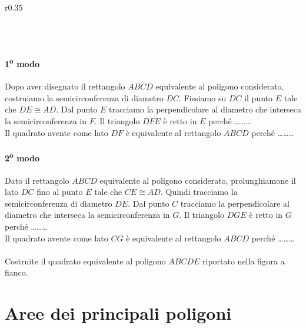 \begin{wrapfigure}{r}{0.35\textwidth}
	
\centering\vspace{6pt}\\
	
\centering\vspace{6pt}
\\
	\centering
\end{wrapfigure}
\paragraph{1\textsuperscript{o} modo}
Dopo aver disegnato il rettangolo \(ABCD\) equivalente al poligono 
considerato, costruiamo la semicirconferenza di diametro \(DC\). 
Fissiamo su \(DC\) il punto \(E\) tale che \(DE\cong AD\). Dal punto \(E\) 
tracciamo la perpendicolare al diametro che interseca la 
semicirconferenza in \(F\). Il triangolo \(DFE\) è retto in \(E\) perché 
\ldots\ldots\ldots{}\\
Il quadrato avente come lato \(DF\) è equivalente al rettangolo \(ABCD\) 
perché \ldots\ldots\ldots{}

\paragraph{2\textsuperscript{o} modo}
Dato il rettangolo \(ABCD\) equivalente al poligono considerato, 
prolunghiamone il lato \(DC\) fino al punto \(E\) tale che \(CE\cong AD\). 
Quindi tracciamo la semicirconferenza di diametro \(DE\). Dal punto \(C\) 
tracciamo la perpendicolare al diametro che interseca la 
semicirconferenza in \(G\). Il triangolo \(DGE\) è retto in \(G\) perché 
\ldots\ldots\ldots{}\\
Il quadrato avente come lato \(CG\) è equivalente al rettangolo \(ABCD\) 
perché \ldots\ldots\ldots{}

\paragraph*{}
Costruite il quadrato equivalente al poligono \(ABCDE\) riportato nella 
figura a fianco.

\section{Aree dei principali poligoni}\label{sect:aree_poligoni}

